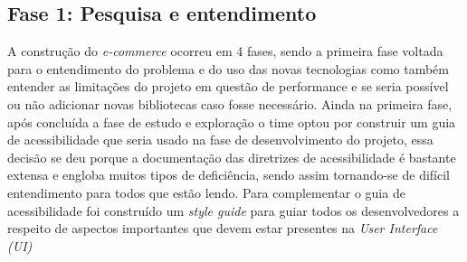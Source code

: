 \subsection{Fase 1: Pesquisa e entendimento}
{A construção do \textit{e-commerce} ocorreu em 4 fases, sendo a primeira fase voltada para o entendimento do problema e do uso das novas tecnologias como também entender as limitações do projeto em questão de performance e se seria possível ou não adicionar novas bibliotecas caso fosse necessário. Ainda na primeira fase, após concluída a fase de estudo e exploração o time optou por construir um guia de acessibilidade que seria usado na fase de desenvolvimento do projeto, essa decisão se deu porque a documentação das diretrizes de acessibilidade é bastante extensa e engloba muitos tipos de deficiência, sendo assim tornando-se de difícil entendimento para todos que estão lendo. Para complementar o guia de acessibilidade foi construído um \textit{style guide} para guiar todos os desenvolvedores a respeito de aspectos importantes que devem estar presentes na \textit{User Interface (UI)}}

